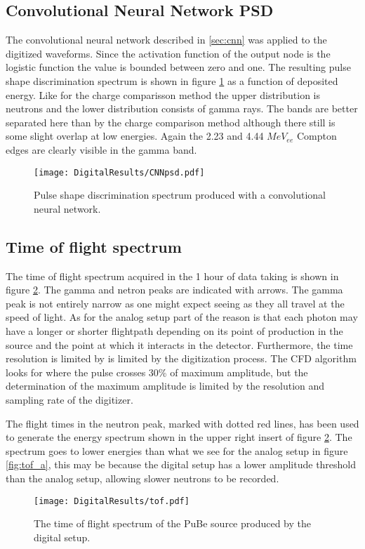 \documentclass[main.tex]{subfiles}
\begin{document}
\subsection{Convolutional Neural Network PSD}
The convolutional neural network described in \ref{sec:cnn} was applied to the digitized waveforms. Since the activation function of the output node is the logistic function the value is bounded between zero and one. The resulting pulse shape discrimination spectrum is shown in figure \ref{fig:cnn_E} as a function of deposited energy. Like for the charge comparisson method the upper distribution is neutrons and the lower distribution consists of gamma rays. The bands are better separated here than by the charge comparison method although there still is some slight overlap at low energies. Again the 2.23 and 4.44 $MeV_{ee}$ Compton edges are clearly visible in the gamma band. 

\begin{figure}[ht]
    \centering
        \texttt{[image: DigitalResults/CNNpsd.pdf]}
        \caption{Pulse shape discrimination spectrum produced with a convolutional neural network.}
    \label{fig:cnn_E} 
\end{figure}

\clearpage
\subsection{Time of flight spectrum}
The time of flight spectrum acquired in the 1 hour of data taking is shown in figure \ref{fig:tof_d}. The gamma and netron peaks are indicated with arrows. The gamma peak is not entirely narrow as one might expect seeing as they all travel at the speed of light. As for the analog setup part of the reason is that each photon may have a longer or shorter flightpath depending on its point of production in the source and the point at which it interacts in the detector. Furthermore, the time resolution is limited by is limited by the digitization process. The CFD algorithm looks for where the pulse crosses 30\% of maximum amplitude, but the determination of the maximum amplitude is limited by the resolution and sampling rate of the digitizer.

The flight times in the neutron peak, marked with dotted red lines, has been used to generate the energy spectrum shown in the upper right insert of figure \ref{fig:tof_d}. The spectrum goes to lower energies than what we see for the analog setup in figure \ref{fig:tof_a}, this may be because the digital setup has a lower amplitude threshold than the analog setup, allowing slower neutrons to be recorded.
\begin{figure}[ht]
    \centering
        \texttt{[image: DigitalResults/tof.pdf]}
        \caption{The time of flight spectrum of the PuBe source produced by the digital setup.}
    \label{fig:tof_d} 
\end{figure}
\end{document}
